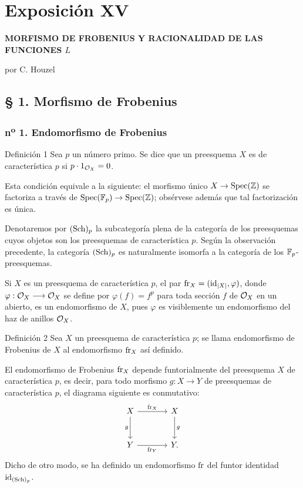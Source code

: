 \clearpage
\section*{Exposición XV}
\begin{center}
\Large\bfseries MORFISMO DE FROBENIUS Y RACIONALIDAD DE LAS FUNCIONES $L$

\medskip
por C. Houzel
\end{center}

\subsection*{§ 1. Morfismo de Frobenius}

\subsubsection*{n\textsuperscript{o} 1. Endomorfismo de Frobenius}

\begin{statement}{Definición 1}
Sea $p$ un número primo. Se dice que un preesquema $X$ es de característica $p$ si $p\cdot 1_{\mathcal{O}_X}=0$.
\end{statement}

Esta condición equivale a la siguiente: el morfismo único $X\to\operatorname{Spec}(\mathbb Z)$ se factoriza a través de $\operatorname{Spec}(\mathbb F_p)\to\operatorname{Spec}(\mathbb Z)$; obsérvese además que tal factorización es única.

Denotaremos por $(\operatorname{Sch})_p$ la subcategoría plena de la categoría de los preesquemas cuyos objetos son los preesquemas de característica $p$. Según la observación precedente, la categoría $(\operatorname{Sch})_p$ es naturalmente isomorfa a la categoría de los $\mathbb F_p$-preesquemas.

Si $X$ es un preesquema de característica $p$, el par $\operatorname{fr}_X=(\operatorname{id}_{|X|},\varphi)$, donde $\varphi:\mathcal{O}_X\longrightarrow\mathcal{O}_X$ se define por $\varphi(f)=f^p$ para toda sección $f$ de $\mathcal{O}_X$ en un abierto, es un endomorfismo de $X$, pues $\varphi$ es visiblemente un endomorfismo del haz de anillos $\mathcal{O}_X$.

\begin{statement}{Definición 2}
Sea $X$ un preesquema de característica $p$; se llama endomorfismo de Frobenius de $X$ al endomorfismo $\operatorname{fr}_X$ así definido.
\end{statement}

El endomorfismo de Frobenius $\operatorname{fr}_X$ depende funtorialmente del preesquema $X$ de característica $p$, es decir, para todo morfismo $g:X\to Y$ de preesquemas de característica $p$, el diagrama siguiente es conmutativo:
\[
\begin{tikzcd}[column sep=large,row sep=large]
X \arrow[r,"\fr_X"] \arrow[d,"g"'] & X \arrow[d,"g"]\\
Y \arrow[r,"\fr_Y"'] & Y.
\end{tikzcd}
\]
Dicho de otro modo, se ha definido un endomorfismo $\operatorname{fr}$ del funtor identidad $\operatorname{id}_{(\operatorname{Sch})_p}$.
